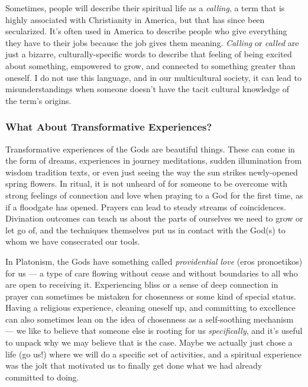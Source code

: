 \documentclass[
]{book}
\begin{document}
Sometimes, people will describe their spiritual life as a \emph{calling}, a term that is highly associated with Christianity in America, but that has since been secularized. It's often used in America to describe people who give everything they have to their jobs because the job gives them meaning. \emph{Calling} or \emph{called} are just a bizarre, culturally-specific words to describe that feeling of being excited about something, empowered to grow, and connected to something greater than oneself. I do not use this language, and in our multicultural society, it can lead to misunderstandings when someone doesn't have the tacit cultural knowledge of the term's origins.

\hypertarget{what-about-transformative-experiences}{%
\subsubsection{What About Transformative Experiences?}\label{what-about-transformative-experiences}}

Transformative experiences of the Gods are beautiful things. These can come in the form of dreams, experiences in journey meditations, sudden illumination from wisdom tradition texts, or even just seeing the way the sun strikes newly-opened spring flowers. In ritual, it is not unheard of for someone to be overcome with strong feelings of connection and love when praying to a God for the first time, as if a floodgate has opened. Prayers can lead to steady streams of coincidences. Divination outcomes can teach us about the parts of ourselves we need to grow or let go of, and the techniques themselves put us in contact with the God(s) to whom we have consecrated our tools.

In Platonism, the Gods have something called \emph{providential love} (eros pronoetikos) for us --- a type of care flowing without cease and without boundaries to all who are open to receiving it. Experiencing bliss or a sense of deep connection in prayer can sometimes be mistaken for chosenness or some kind of special status. Having a religious experience, cleaning oneself up, and committing to excellence can also sometimes lean on the idea of chosenness as a self-soothing mechanism --- we like to believe that someone else is rooting for us \emph{specifically}, and it's useful to unpack why we may believe that is the case. Maybe we actually just chose a life (go us!) where we will do a specific set of activities, and a spiritual experience was the jolt that motivated us to finally get done what we had already committed to doing.
\end{document}
